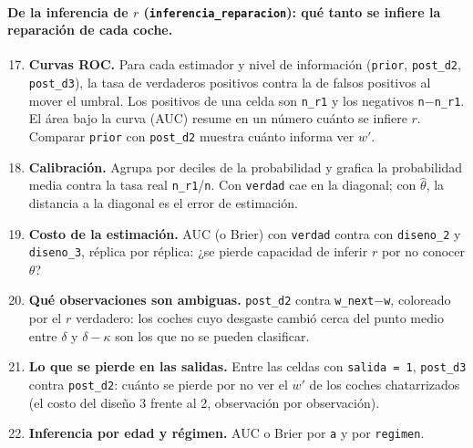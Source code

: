 \documentclass[11pt]{article}
\newcommand{\col}[1]{\texttt{#1}}
\begin{document}
\paragraph{De la inferencia de $r$ (\texttt{inferencia\_reparacion}): qué tanto se infiere la
reparación de cada coche.}
\begin{enumerate}
  \setcounter{enumi}{16}
  \item \textbf{Curvas ROC.} Para cada estimador y nivel de información (\col{prior},
  \col{post\_d2}, \col{post\_d3}), la tasa de verdaderos positivos contra la de falsos
  positivos al mover el umbral. Los positivos de una celda son \col{n\_r1} y los negativos
  \col{n}$-$\col{n\_r1}. El área bajo la curva (AUC) resume en un número cuánto se infiere $r$.
  Comparar \col{prior} con \col{post\_d2} muestra cuánto informa ver $w'$.
  \item \textbf{Calibración.} Agrupa por deciles de la probabilidad y grafica la probabilidad
  media contra la tasa real \col{n\_r1}/\col{n}. Con \col{verdad} cae en la diagonal; con
  $\hat\theta$, la distancia a la diagonal es el error de estimación.
  \item \textbf{Costo de la estimación.} AUC (o Brier) con \col{verdad} contra con
  \col{diseno\_2} y \col{diseno\_3}, réplica por réplica: ¿se pierde capacidad de inferir $r$
  por no conocer $\theta$?
  \item \textbf{Qué observaciones son ambiguas.} \col{post\_d2} contra \col{w\_next}$-$\col{w},
  coloreado por el $r$ verdadero: los coches cuyo desgaste cambió cerca del punto medio entre
  $\delta$ y $\delta-\kappa$ son los que no se pueden clasificar.
  \item \textbf{Lo que se pierde en las salidas.} Entre las celdas con \col{salida = 1},
  \col{post\_d3} contra \col{post\_d2}: cuánto se pierde por no ver el $w'$ de los coches
  chatarrizados (el costo del diseño 3 frente al 2, observación por observación).
  \item \textbf{Inferencia por edad y régimen.} AUC o Brier por \col{a} y por \col{regimen}.
\end{enumerate}
\end{document}
